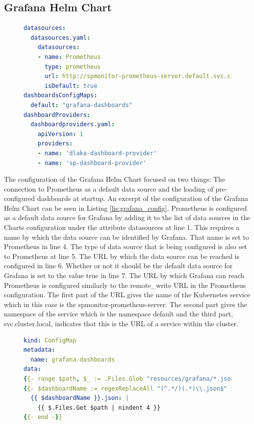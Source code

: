 \subsection*{Grafana Helm Chart}

\begin{figure}[tb]
\begin{lstlisting}[caption = {Grafana Helm Chart Configuration}, label = {lis:grafana_config}, style = kit-cm, language=yaml]
datasources:
  datasources.yaml:
    datasources:
    - name: Prometheus
      type: prometheus
      url: http://spmonitor-prometheus-server.default.svc.cluster.local
      isDefault: true
dashboardsConfigMaps:
  default: "grafana-dashboards"
dashboardProviders:
  dashboardproviders.yaml:
    apiVersion: 1
    providers:
    - name: 'dlaka-dashboard-provider'
    - name: 'sp-dashboard-provider'
\end{lstlisting}
\end{figure}

The configuration of the Grafana Helm Chart \cite{GRA-HELM} focused on two things:
The connection to Prometheus as a default data source and the loading of pre-configured
dashboards at startup. An excerpt of the configuration of the Grafana Helm Chart
can be seen in Listing \ref{lis:grafana_config}.
Prometheus is configured as a default data source for Grafana by adding it to the list
of data sources in the Charts configuration under the attribute datasources at line 1.
This requires a name by which the data source can be identified by Grafana.
That name is set to Prometheus in line 4.
The type of data source that is being configured is also set to Prometheus at line 5.
The URL by which the data source can be reached is configured in line 6.
Whether or not it should be the default data source for Grafana is set to the value true in line 7.
The URL by which Grafana can reach Prometheus is configured similarly to the remote\_write
URL in the Prometheus configuration. The first part of the URL gives the name of the Kubernetes
service which in this case is the spmonitor-prometheus-server. The second part gives
the namespace of the service which is the namespace default and the third part, svc.cluster.local,
indicates that this is the URL of a service within the cluster.

\begin{figure}[tb]
\begin{lstlisting}[caption = {Grafana Dashboards ConfigMap}, label = {lis:grafana_dashboards_configmap}, style = kit-cm, language=yaml]
kind: ConfigMap
metadata:
  name: grafana-dashboards
data:
{{- range $path, $_ := .Files.Glob "resources/grafana/*.json" -}}
{{- $dashboardName := regexReplaceAll "(^.*/)(.*)\\.json$" $path "${2}" }}
  {{ $dashboardName }}.json: |
    {{ $.Files.Get $path | nindent 4 }}
{{- end -}}
\end{lstlisting}
\end{figure}

